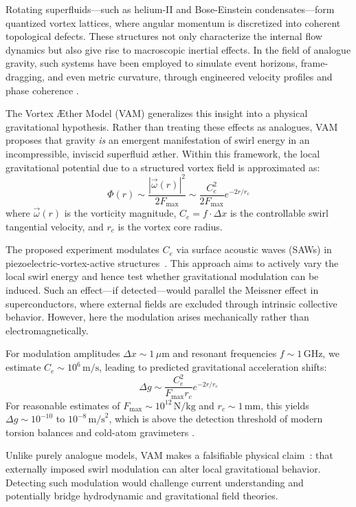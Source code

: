 \documentclass[12pt]{article}
\begin{document}
    Rotating superfluids—such as helium-II and Bose-Einstein condensates—form quantized vortex lattices, where angular momentum is discretized into coherent topological defects. These structures not only characterize the internal flow dynamics but also give rise to macroscopic inertial effects. In the field of analogue gravity, such systems have been employed to simulate event horizons, frame-dragging, and even metric curvature, through engineered velocity profiles and phase coherence \cite{barcelo2005analogue,volovik2003universe}.

    The Vortex \AE{}ther Model (VAM) generalizes this insight into a physical gravitational hypothesis. Rather than treating these effects as analogues, VAM proposes that gravity \emph{is} an emergent manifestation of swirl energy in an incompressible, inviscid superfluid \ae ther. Within this framework, the local gravitational potential due to a structured vortex field is approximated as:
    \[
        \Phi(r) \sim \frac{|\vec{\omega}(r)|^2}{2 F_{\text{max}}} \sim \frac{C_e^2}{2 F_{\text{max}}} e^{-2r/r_c}
    \]
    where \( \vec{\omega}(r) \) is the vorticity magnitude, \( C_e = f \cdot \Delta x \) is the controllable swirl tangential velocity, and \( r_c \) is the vortex core radius.

    The proposed experiment modulates \( C_e \) via surface acoustic waves (SAWs) in piezoelectric-vortex-active structures~\cite{iskandarani2025experimentalCe}. This approach aims to actively vary the local swirl energy and hence test whether gravitational modulation can be induced. Such an effect—if detected—would parallel the Meissner effect in superconductors, where external fields are excluded through intrinsic collective behavior. However, here the modulation arises mechanically rather than electromagnetically.

    For modulation amplitudes \( \Delta x \sim 1 \, \mu\text{m} \) and resonant frequencies \( f \sim 1\, \text{GHz} \), we estimate \( C_e \sim 10^6 \, \text{m/s} \), leading to predicted gravitational acceleration shifts:
    \[
        \Delta g \sim \frac{C_e^2}{F_{\text{max}} r_c} e^{-2r/r_c}
    \]
    For reasonable estimates of \( F_{\text{max}} \sim 10^{12} \, \text{N/kg} \) and \( r_c \sim 1 \, \text{mm} \), this yields \( \Delta g \sim 10^{-10} \) to \( 10^{-8} \, \text{m/s}^2 \), which is above the detection threshold of modern torsion balances and cold-atom gravimeters \cite{packard1998superfluid,zmeev2018masssensor}.

    Unlike purely analogue models, VAM makes a falsifiable physical claim~\cite{iskandarani2025benchmark}: that externally imposed swirl modulation can alter local gravitational behavior. Detecting such modulation would challenge current understanding and potentially bridge hydrodynamic and gravitational field theories.
\end{document}
